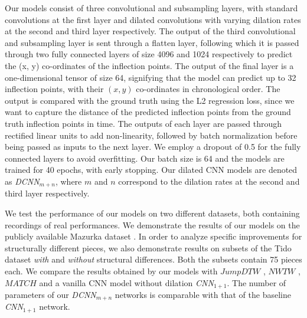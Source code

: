 \documentclass{article}
\begin{document}
Our models consist of three convolutional and subsampling layers, with standard convolutions at the first layer and dilated convolutions with varying dilation rates at the second and third layer respectively. The output of the third convolutional and subsampling layer is sent through a flatten layer, following which it is passed through two fully connected layers of size 4096 and 1024 respectively to predict the (x, y) co-ordinates of the inflection points. The output of the final layer is a one-dimensional tensor of size 64, signifying that the model can predict up to 32 inflection points, with their $(x, y)$ co-ordinates in chronological order. The output is compared with the ground truth using the L2 regression loss, since we want to capture the distance of the predicted inflection points from the ground truth inflection points in time. The outputs of each layer are passed through rectified linear units to add non-linearity, followed by batch normalization before being passed as inputs to the next layer. We employ a dropout of 0.5 for the fully connected layers to avoid overfitting. Our batch size is 64 and the models are trained for 40 epochs, with early stopping. Our dilated CNN models are denoted as  \emph{DCNN}${}_{m+n}$, where $m$ and $n$ correspond to the dilation rates at the second and third layer respectively. 
\par We test the performance of our models on two different datasets, both containing recordings of real performances. We demonstrate the results of our models on the publicly available Mazurka dataset \cite{sapp2007comparative}. In order to analyze specific improvements for structurally different pieces, we also demonstrate results on subsets of the Tido dataset \emph{with} and \emph{without} structural differences. Both the subsets contain 75 pieces each. We compare the results obtained by our models with \begin{math} \textit{JumpDTW}\end{math} \cite{Fremerey2010handling}, \begin{math}\textit{NWTW}\end{math} \cite{grachten2013automatic}, \begin{math}\textit{MATCH}\end{math} \cite{dixon2005line} and a vanilla CNN model without dilation     \emph{CNN}${}_{1+1}$. The number of parameters of  our \emph{DCNN}${}_{m+n}$ networks is comparable with that of the baseline \emph{CNN}${}_{1+1}$ network.
\end{document}
